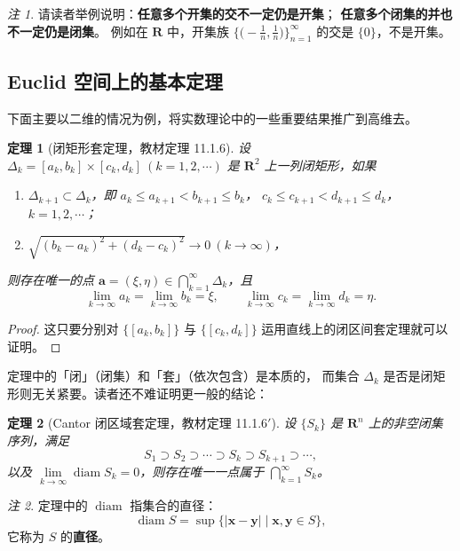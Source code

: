 \documentclass[11pt]{ctexart}
\theoremstyle{plain}
\newtheorem{thm}{定理}[section]
\theoremstyle{definition}
\theoremstyle{remark}
\newtheorem*{rem}{注}
\begin{document}
\begin{rem}
请读者举例说明：\textbf{任意多个开集的交不一定仍是开集}；
\textbf{任意多个闭集的并也不一定仍是闭集}。
例如在 \(\mathbf{R}\) 中，开集族 \(\bigl\{\bigl(-\tfrac{1}{n},\tfrac{1}{n}\bigr)\bigr\}_{n=1}^{\infty}\)
的交是 \(\{0\}\)，不是开集。
\end{rem}

\subsection{Euclid 空间上的基本定理}

下面主要以二维的情况为例，将实数理论中的一些重要结果推广到高维去。

\begin{thm}[闭矩形套定理，教材定理 11.1.6]\label{thm:rectnest}
设 \(\Delta_k=[a_k,b_k]\times[c_k,d_k]\ (k=1,2,\cdots)\) 是 \(\mathbf{R}^2\) 上一列闭矩形，如果
\begin{enumerate}
  \item \(\Delta_{k+1}\subset\Delta_k\)，即
        \(a_k\le a_{k+1}<b_{k+1}\le b_k\)，
        \(c_k\le c_{k+1}<d_{k+1}\le d_k\)，\(k=1,2,\cdots\)；
  \item \(\sqrt{(b_k-a_k)^2+(d_k-c_k)^2}\to 0\ (k\to\infty)\)，
\end{enumerate}
则存在唯一的点 \(\boldsymbol{a}=(\xi,\eta)\in\bigcap_{k=1}^{\infty}\Delta_k\)，且
\[
  \lim_{k\to\infty}a_k=\lim_{k\to\infty}b_k=\xi,\qquad
  \lim_{k\to\infty}c_k=\lim_{k\to\infty}d_k=\eta .
\]
\end{thm}

\begin{proof}
这只要分别对 \(\{[a_k,b_k]\}\) 与 \(\{[c_k,d_k]\}\) 运用直线上的闭区间套定理就可以证明。
\end{proof}

定理中的「闭」（闭集）和「套」（依次包含）是本质的，
而集合 \(\Delta_k\) 是否是闭矩形则无关紧要。读者还不难证明更一般的结论：

\begin{thm}[Cantor 闭区域套定理，教材定理 11.1.6$'$]\label{thm:cantor}
设 \(\{S_k\}\) 是 \(\mathbf{R}^n\) 上的非空闭集序列，满足
\[
  S_1\supset S_2\supset\cdots\supset S_k\supset S_{k+1}\supset\cdots,
\]
以及 \(\lim\limits_{k\to\infty}\operatorname{diam}S_k=0\)，则存在唯一一点属于
\(\bigcap_{k=1}^{\infty}S_k\)。
\end{thm}

\begin{rem}
定理中的 \(\operatorname{diam}\) 指集合的直径：
\[
  \operatorname{diam}S=\sup\{|\boldsymbol{x}-\boldsymbol{y}|\mid \boldsymbol{x},\boldsymbol{y}\in S\},
\]
它称为 \(S\) 的\textbf{直径}。
\end{rem}
\end{document}
